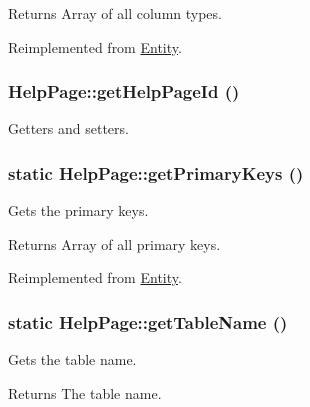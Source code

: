 \begin{DoxyReturn}{Returns}
Array of all column types. 
\end{DoxyReturn}


Reimplemented from \hyperlink{classEntity_ad69437219c10955803707fbf6ac458e7}{Entity}.

\hypertarget{classHelpPage_a2550e4763c227585f61e019d693ffc68}{
\subsubsection[{getHelpPageId}]{\setlength{\rightskip}{0pt plus 5cm}HelpPage::getHelpPageId ()}}
\label{classHelpPage_a2550e4763c227585f61e019d693ffc68}
Getters and setters. \hypertarget{classHelpPage_aad190998d886f0c38ecbb056f32c2b96}{
\subsubsection[{getPrimaryKeys}]{\setlength{\rightskip}{0pt plus 5cm}static HelpPage::getPrimaryKeys ()}}
\label{classHelpPage_aad190998d886f0c38ecbb056f32c2b96}
Gets the primary keys.

\begin{DoxyReturn}{Returns}
Array of all primary keys. 
\end{DoxyReturn}


Reimplemented from \hyperlink{classEntity_a61bbfbb4058427174e002a09ddc77c41}{Entity}.

\hypertarget{classHelpPage_a28380b31bea21840c86ab69c49cad198}{
\subsubsection[{getTableName}]{\setlength{\rightskip}{0pt plus 5cm}static HelpPage::getTableName ()}}
\label{classHelpPage_a28380b31bea21840c86ab69c49cad198}
Gets the table name.

\begin{DoxyReturn}{Returns}
The table name. 
\end{DoxyReturn}


